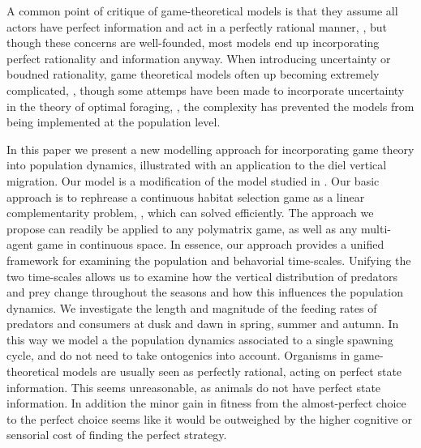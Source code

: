 A common point of critique of game-theoretical models is that they assume all actors have perfect information and act in a perfectly rational manner, \citep{critiqueofgametheory}, but though these concerns are well-founded, most models end up incorporating perfect rationality and information anyway. When introducing uncertainty or boudned rationality, game theoretical models often up becoming extremely complicated, \citep{}, though some attemps have been made to incorporate uncertainty in the theory of optimal foraging, \citep{sih, others}, the complexity has prevented the models from being implemented at the population level.








In this paper we present a new modelling approach for incorporating game theory into population dynamics, illustrated with an application to the diel vertical migration. Our model is a modification of the model studied in \citep{verticalmigration}. Our basic approach is to rephrease a continuous habitat selection game as a linear complementarity problem, \citep{miller1991copositive}, which can solved efficiently. The approach we propose can readily be applied to any polymatrix game, as well as any multi-agent game in continuous space. In essence, our approach provides a unified framework for examining the population and behavorial time-scales.  Unifying the two time-scales allows us to examine how the vertical distribution of predators and prey change throughout the seasons and how this influences the population dynamics. We investigate the length and magnitude of the feeding rates of predators and consumers at dusk and dawn in spring, summer and autumn. In this way we model a the population dynamics associated to a single spawning cycle, and do not need to take ontogenics into account.
Organisms in game-theoretical models are usually seen as perfectly rational, acting on perfect state information. This seems unreasonable, as animals do not have perfect state information. In addition the minor gain in fitness from the almost-perfect choice to the perfect choice seems like it would be outweighed by the higher cognitive or sensorial cost of finding the perfect strategy.

